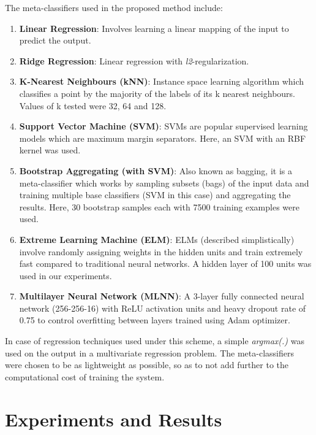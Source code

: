 \documentclass[10pt,conference,a4paper]{IEEEtran}
\begin{document}
The meta-classifiers used in the proposed method include:
\begin{enumerate}
	\item \textbf{Linear Regression}: Involves learning a linear mapping of the input to predict the output.
	\item \textbf{Ridge Regression}: Linear regression with \textit{l2}-regularization.
	\item \textbf{K-Nearest Neighbours (kNN)}: Instance space learning algorithm which classifies a point by the majority of the labels of its k nearest neighbours. Values of k tested were 32, 64 and 128.
	\item \textbf{Support Vector Machine (SVM)}: SVMs are popular supervised learning models which are maximum margin separators. Here, an SVM with an RBF kernel was used.
	\item \textbf{Bootstrap Aggregating (with SVM)}: Also known as bagging, it is a meta-classifier which works by sampling subsets (bags) of the input data and training multiple base classifiers (SVM in this case) and aggregating the results. Here, 30 bootstrap samples each with 7500 training examples were used.
	\item \textbf{Extreme Learning Machine (ELM)}: ELMs (described simplistically) involve randomly assigning weights in the hidden units and train extremely fast compared to traditional neural networks. A hidden layer of 100 units was used in our experiments.
	\item \textbf{Multilayer Neural Network (MLNN)}: A 3-layer fully connected neural network (256-256-16) with ReLU activation units and heavy dropout rate of 0.75 to control overfitting between layers trained using Adam optimizer.
\end{enumerate}


In case of regression techniques used under this scheme, a simple \textit{argmax(.)} was used on the output in a multivariate regression problem. The meta-classifiers were chosen to be as lightweight as possible, so as to not add further to the computational cost of training the system.




	


\section{Experiments and Results}
\end{document}
